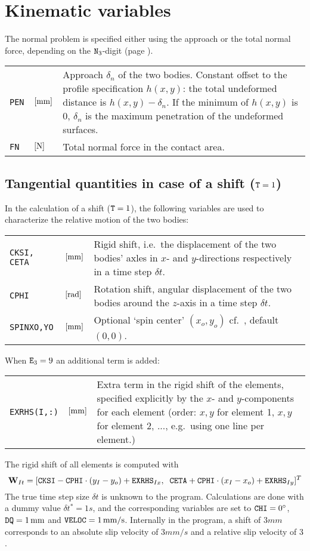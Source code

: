 \documentclass[12pt]{report}
\newenvironment{inputvars}{\vspace{0.4\baselineskip}%

\begin{tabular}{>{\raggedright}p{22mm}p{19mm}p{113mm}}}{
\end{tabular}

}
\newcommand{\inpvar}[3]{{\small\tt #1} & $#2$ & #3 \\[1ex]}
\begin{document}
\section{Kinematic variables}
\label{sec:kincns}

The normal problem is specified either using the approach or the total
normal force, depending on the ${\tt N}_3$-digit (page \pageref{n3-digit}).
\begin{inputvars}
\inpvar{PEN}{\bunit{mm}}{Approach $\delta_n$ of the two bodies. Constant offset to
        the profile specification $h(x,y)$: the total undeformed distance
        is $h(x,y)-\delta_n$. If the minimum of $h(x,y)$ is 0, $\delta_n$ is
        the maximum penetration of the undeformed surfaces.}
\inpvar{FN}{\bunit{N}}{Total normal force in the contact area.}
\end{inputvars}

\subsection{\texorpdfstring{Tangential quantities in case of a shift 
        (${\tt T}=1$)}{}}
\label{sec:kincns_shift}

In the calculation of a shift (${\tt T}=1$), the following variables are used
to characterize the relative motion of the two bodies:
\begin{inputvars}
\inpvar{CKSI, CETA}{\bunit{mm}}{Rigid shift, i.e.\ the displacement of the two
        bodies' axles in $x$- and $y$-directions respectively in a time
        step $\delta t$.}
\inpvar{CPHI}{\bunit{rad}}{Rotation shift, angular displacement of the two
        bodies around the $z$-axis in a time step $\delta t$.}
\inpvar{SPINXO,YO}{\bunit{mm}}{Optional `spin center' $(x_o,y_o)$ cf.\
        \cite{Vollebregt2018a-sdec}, default $(0,0)$.}
\end{inputvars}
When ${\tt E}_3=9$ an additional term is added:
\begin{inputvars}
\inpvar{EXRHS(I,:)}{\bunit{mm}}{Extra term in the rigid shift of the elements,
        specified explicitly by the $x$- and $y$-components for each
        element (order: $x,y$ for element 1, $x,y$ for element 2, ...,
        e.g.\ using one line per element.)}
\end{inputvars}
The rigid shift of all elements is computed with
\begin{equation}
    \vec{W}_{It} = [{\tt CKSI} - {\tt CPHI} \cdot (y_I-y_o) + 
                                                {\tt EXRHS}_{Ix},  \;\;
     {\tt CETA} + {\tt CPHI} \cdot (x_I-x_o) + {\tt EXRHS}_{Iy}  ]^T
\end{equation}
The true time step size $\delta t$ is unknown to the program. Calculations
are done with a dummy value $\delta t^*=1\unit{s}$, and the corresponding
variables are set to ${\tt CHI}=0^\circ$, ${\tt DQ}=1\unit{mm}$ and
${\tt VELOC}=1\unit{mm/s}$. Internally in the program, a shift of $3\unit{mm}$
corresponds to an absolute slip velocity of $3\unit{mm/s}$ and a relative
slip velocity of $3$.
\end{document}
